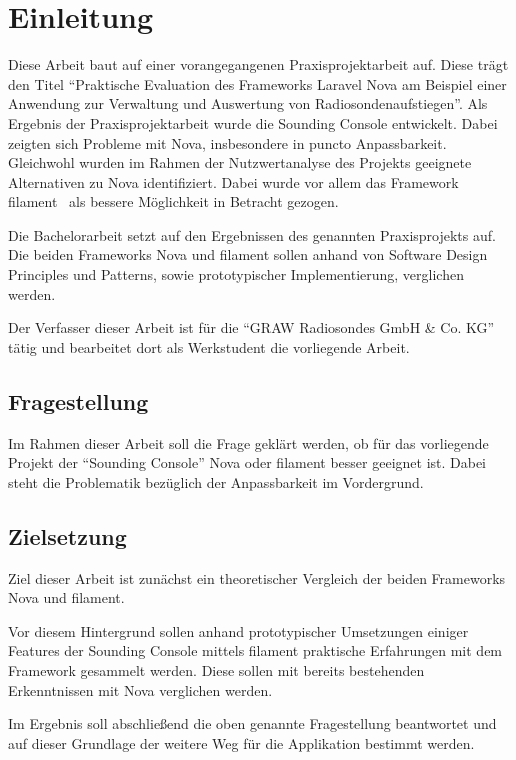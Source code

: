 \section{Einleitung}

Diese Arbeit baut auf einer vorangegangenen Praxisprojektarbeit auf.
Diese trägt den Titel \enquote{Praktische Evaluation des Frameworks Laravel Nova am Beispiel einer Anwendung zur Verwaltung und Auswertung von Radiosondenaufstiegen}.
Als Ergebnis der Praxisprojektarbeit wurde die Sounding Console entwickelt.
Dabei zeigten sich Probleme mit Nova, insbesondere in puncto Anpassbarkeit.
Gleichwohl wurden im Rahmen der Nutzwertanalyse des Projekts geeignete Alternativen zu Nova identifiziert.
Dabei wurde vor allem das Framework filament~\cite{filament} als bessere Möglichkeit in Betracht gezogen.

Die Bachelorarbeit setzt auf den Ergebnissen des genannten Praxisprojekts auf.
Die beiden Frameworks Nova und filament sollen anhand von Software Design Principles und Patterns, sowie prototypischer Implementierung, verglichen werden.

Der Verfasser dieser Arbeit ist für die \enquote{GRAW Radiosondes GmbH \& Co. KG}\cite{graw} tätig und bearbeitet dort als Werkstudent die vorliegende Arbeit.

\subsection{Fragestellung}
Im Rahmen dieser Arbeit soll die Frage geklärt werden, ob für das vorliegende Projekt der \enquote{Sounding Console} Nova oder filament besser geeignet ist.
Dabei steht die Problematik bezüglich der Anpassbarkeit im Vordergrund.

\subsection{Zielsetzung}
Ziel dieser Arbeit ist zunächst ein theoretischer Vergleich der beiden Frameworks Nova und filament.

Vor diesem Hintergrund sollen anhand prototypischer Umsetzungen einiger Features der Sounding Console mittels filament praktische Erfahrungen mit dem Framework gesammelt werden.
Diese sollen mit bereits bestehenden Erkenntnissen mit Nova verglichen werden.

Im Ergebnis soll abschließend die oben genannte Fragestellung beantwortet und auf dieser Grundlage der weitere Weg für die Applikation bestimmt werden.
